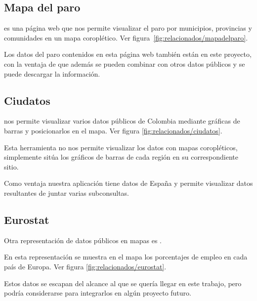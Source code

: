 \subsection{Mapa del paro}

 es una página web que nos permite visualizar el paro por municipios, provincias y comunidades en un mapa coroplético. Ver figura~\ref{fig:relacionados/mapadelparo}.

Los datos del paro contenidos en esta página web también están en este proyecto, con la ventaja de que además se pueden combinar con otros datos públicos y se puede descargar la información.


\subsection{Ciudatos}

 nos permite visualizar varios datos públicos de Colombia mediante gráficas de barras y posicionarlos en el mapa. Ver figura \ref{fig:relacionados/ciudatos}.

Esta herramienta no nos permite visualizar los datos con mapas coropléticos, simplemente sitúa los gráficos de barras de cada región en su correspondiente sitio.

Como ventaja nuestra aplicación tiene datos de España y permite visualizar datos resultantes de juntar varias subconsultas.


\subsection{Eurostat}

Otra representación de datos públicos en mapas es .

En esta representación se muestra en el mapa los porcentajes de empleo en cada país de Europa. Ver figura \ref{fig:relacionados/eurostat}.

Estos datos se escapan del alcance al que se quería llegar en este trabajo, pero podría considerarse para integrarlos en algún proyecto futuro.


